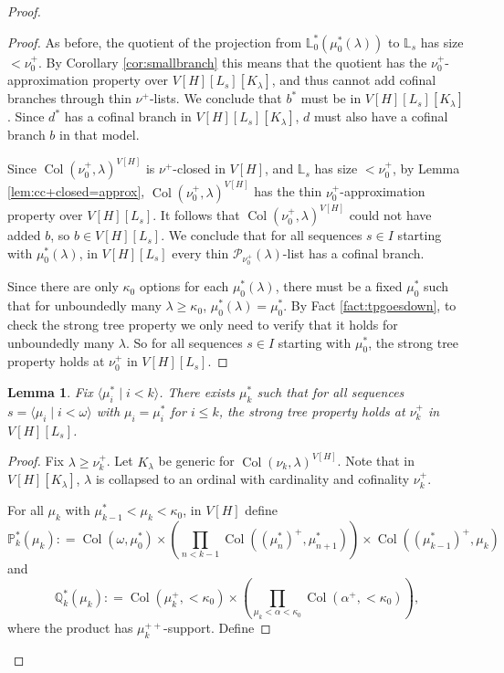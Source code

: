 \documentclass[psamsfonts]{amsart}
\newtheorem{lemma}[thm]{Lemma}
\theoremstyle{definition}
\newcommand{\defeq}{\mathrel{\mathop:}=}
\newcommand{\Q}{\mathbb{Q}}
\newcommand{\PP}{\mathbb{P}}
\newcommand{\LL}{\mathbb{L}}
\newcommand{\la}{\lambda}
\newcommand{\ka}{\kappa}
\newcommand{\w}{\omega}
\newcommand{\mc}{\mathcal}
\DeclareMathOperator{\Coll}{Col}
\numberwithin{equation}{section}
\begin{document}
\begin{proof}
\begin{proof}
		As before, the quotient of the projection from $\LL_0^*(\mu^*_0(\la))$ to $\LL_s$ has size $<\nu_0^+$. By Corollary \ref{cor:smallbranch} this means that the quotient has the $\nu_0^+$-approximation property over $V[H][L_s][K_\la]$, and thus cannot add cofinal branches through thin $\nu^+$-lists. We conclude that $b^*$ must be in $V[H][L_s][K_\la]$. Since $d^*$ has a cofinal branch in $V[H][L_s][K_\la]$, $d$ must also have a cofinal branch $b$ in that model.
		
		Since $\Coll(\nu_0^+, \la)^{V[H]}$ is $\nu^+$-closed in $V[H]$, and $\LL_s$ has size $<\nu_0^+$, by Lemma \ref{lem:cc+closed=approx}, $\Coll(\nu_0^+, \la)^{V[H]}$ has the thin $\nu_0^+$-approximation property over $V[H][L_s]$. It follows that $\Coll(\nu_0^+, \la)^{V[H]}$ could not have added $b$, so $b \in V[H][L_s]$. We conclude that for all sequences $s \in I$ starting with $\mu^*_0(\la)$, in $V[H][L_s]$ every thin $\mc{P}_{\nu_0^+}(\la)$-list has a cofinal branch.
		
		Since there are only $\ka_0$ options for each $\mu^*_0(\la)$, there must be a fixed $\mu_0^*$ such that for unboundedly many $\la \geq \ka_0$, $\mu_0^*(\la) = \mu_0^*$. 
		By Fact \ref{fact:tpgoesdown}, to check the strong tree property we only need to verify that it holds for unboundedly many $\la$. So for all sequences $s\in I$ starting with $\mu_0^*$, the strong tree property holds at $\nu_0^+$ in $V[H][L_s]$.
	\end{proof}
	
	
	\begin{lemma}\label{lem:indstp}
		Fix $\langle \mu^*_i \mid i<k\rangle$. There exists $\mu_k^*$ such that for all sequences $s = \langle \mu_i \mid i<\w\rangle$ with $\mu_i = \mu_i^*$ for $i \leq k$, the strong tree property holds at $\nu_k^+$ in $V[H][L_s]$.
	\end{lemma}
	\begin{proof}
		Fix $\la \geq \nu_k^+$. Let $K_\la$ be generic for $\Coll(\nu_k, \la)^{V[H]}$. Note that in $V[H][K_\la]$, $\la$ is collapsed to an ordinal with cardinality and cofinality $\nu_k^+$.
		
		For all $\mu_k$ with $\mu^*_{k-1} < \mu_k < \ka_0$, in $V[H]$ define
		\[\PP^*_k(\mu_k) \defeq \Coll(\w, \mu_0^*) \times \left(\prod_{n<k-1}\Coll((\mu^*_n)^+, \mu^*_{n+1})\right)\times \Coll((\mu^*_{k-1})^+, \mu_k)\]
		and
		\[\Q^*_k(\mu_k) \defeq \Coll(\mu_k^+, <\ka_0) \times \left(\prod_{\mu_k < \alpha < \ka_0} \Coll(\alpha^+, <\ka_0)\right),\]
		where the product has $\mu_k^{++}$-support. Define
		

\end{proof}
\end{proof}
\end{document}
